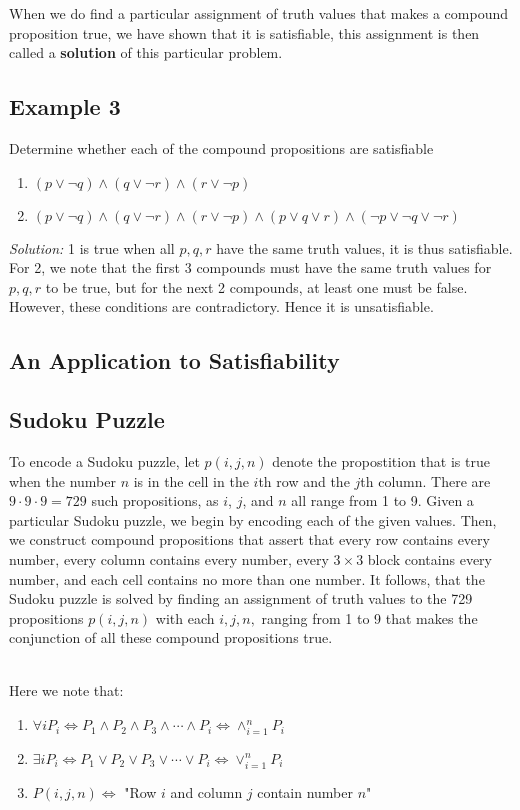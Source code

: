 \documentclass{article}
\begin{document}
\noindent When we do find a particular assignment of truth values that makes a compound proposition true, we have shown that it is satisfiable, this
assignment is then called a \textbf{solution} of this particular problem.
\subsection*{Example 3}
Determine whether each of the compound propositions are satisfiable
\begin{enumerate}
	\item $(p \vee \neg q) \wedge (q \vee \neg r) \wedge (r \vee \neg p)$
	\item $(p \vee \neg q) \wedge (q \vee \neg r) \wedge (r \vee \neg p) \wedge (p \vee q \vee r) \wedge (\neg p \vee \neg q \vee \neg r)$
\end{enumerate}

\noindent \textit{Solution:} 1 is true when all $p, q, r$ have the same truth values, it is thus satisfiable.
For 2, we note that the first 3 compounds must have the same truth values for $p, q, r$ to be true, but for the next 2 compounds, at least one must be false.
However, these conditions are contradictory. Hence it is unsatisfiable.

\subsection{An Application to Satisfiability}
\subsection*{Sudoku Puzzle}
To encode a Sudoku puzzle, let $p(i,j,n)$ denote the propostition that is true when the number $n$ is in the cell in the $i$th row and the $j$th column.
There are $9 \cdot 9 \cdot 9 = 729$ such propositions, as $i$, $j$, and $n$ all range from 1 to 9.
\newline Given a particular Sudoku puzzle, we begin by encoding each of the given values. Then, we construct compound propositions that assert that every
row contains every number, every column contains every number, every $3 \times 3$ block contains every number, and each cell contains no more than one number.
It follows, that the Sudoku puzzle is solved by finding an assignment of truth values to the 729 propositions $p(i,j,n)$ with each $i, j, n,$ ranging from 1 to 9 that makes
the conjunction of all these compound propositions true.

\noindent \\ Here we note that:
\begin{enumerate}
	\item $\forall iP_{i} \Leftrightarrow P_{1} \wedge P_{2} \wedge P_{3} \wedge \cdots \wedge P_{i} \Leftrightarrow \wedge_{i=1}^{n}P_{i}$
	\item $\exists iP_{i} \Leftrightarrow P_{1} \vee P_{2} \vee P_{3} \vee \cdots \vee P_{i} \Leftrightarrow \vee_{i=1}^{n}P_{i}$
	\item $P(i,j,n) \Leftrightarrow$ "Row $i$ and column $j$ contain number $n$"
\end{enumerate}
\end{document}
